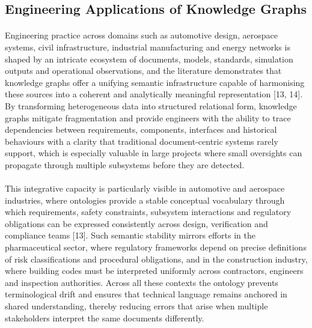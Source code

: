     \subsection{Engineering Applications of Knowledge Graphs}
        \paragraph{}
        Engineering practice across domains such as automotive design, aerospace systems, civil infrastructure, industrial manufacturing and energy networks is shaped by an intricate ecosystem of documents, models, standards, simulation outputs and operational observations, and the literature demonstrates that knowledge graphs offer a unifying semantic infrastructure capable of harmonising these sources into a coherent and analytically meaningful representation [13, 14]. By transforming heterogeneous data into structured relational form, knowledge graphs mitigate fragmentation and provide engineers with the ability to trace dependencies between requirements, components, interfaces and historical behaviours with a clarity that traditional document-centric systems rarely support, which is especially valuable in large projects where small oversights can propagate through multiple subsystems before they are detected.

        \paragraph{}
        This integrative capacity is particularly visible in automotive and aerospace industries, where ontologies provide a stable conceptual vocabulary through which requirements, safety constraints, subsystem interactions and regulatory obligations can be expressed consistently across design, verification and compliance teams [13]. Such semantic stability mirrors efforts in the pharmaceutical sector, where regulatory frameworks depend on precise definitions of risk classifications and procedural obligations, and in the construction industry, where building codes must be interpreted uniformly across contractors, engineers and inspection authorities. Across all these contexts the ontology prevents terminological drift and ensures that technical language remains anchored in shared understanding, thereby reducing errors that arise when multiple stakeholders interpret the same documents differently.

